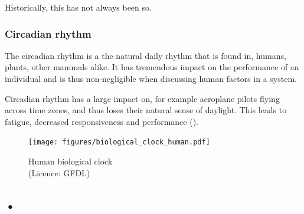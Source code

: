 Historically, this has not always been so.

\subsubsection{Circadian rhythm}
The circadian rhythm is a the natural daily rhythm that is found in, humans, plants, other mammals alike. It has tremendous impact on the performance of an individual and is thus non-negligible when discussing human factors in a system.

Circadian rhythm has a large impact on, for example aeroplane pilots flying across time zones, and thus loses their natural sense of daylight. This leads to fatigue, decreased responsiveness and performance (\cite{mallis2010aircrew}).
\begin{figure}[h]
 \centering
   \texttt{[image: figures/biological\_clock\_human.pdf]}
 \caption{Human biological clock \\(Licence: GFDL)}
 \label{fig:human_biological_clock}
\end{figure}


\subsection{•}

